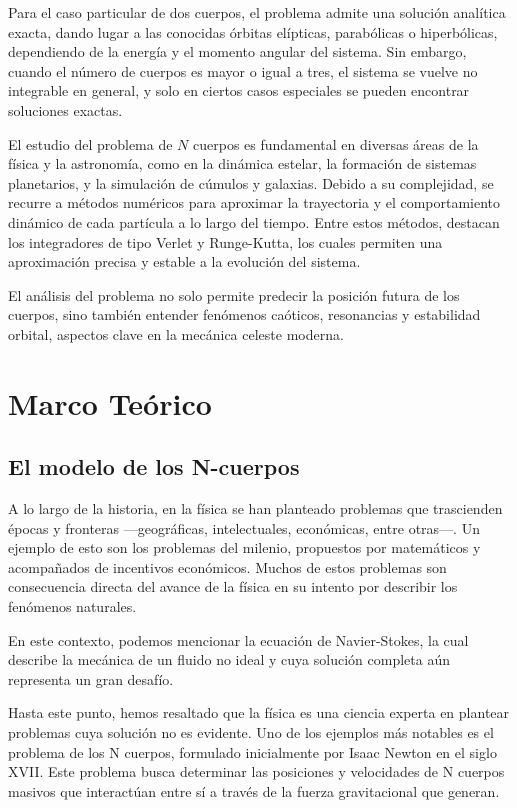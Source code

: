 Para el caso particular de dos cuerpos, el problema admite una solución analítica exacta, dando lugar a las conocidas órbitas elípticas, parabólicas o hiperbólicas, dependiendo de la energía y el momento angular del sistema. Sin embargo, cuando el número de cuerpos es mayor o igual a tres, el sistema se vuelve no integrable en general, y solo en ciertos casos especiales se pueden encontrar soluciones exactas. 

El estudio del problema de \(N\) cuerpos es fundamental en diversas áreas de la física y la astronomía, como en la dinámica estelar, la formación de sistemas planetarios, y la simulación de cúmulos y galaxias. Debido a su complejidad, se recurre a métodos numéricos para aproximar la trayectoria y el comportamiento dinámico de cada partícula a lo largo del tiempo. Entre estos métodos, destacan los integradores de tipo Verlet y Runge-Kutta, los cuales permiten una aproximación precisa y estable a la evolución del sistema. 

El análisis del problema no solo permite predecir la posición futura de los cuerpos, sino también entender fenómenos caóticos, resonancias y estabilidad orbital, aspectos clave en la mecánica celeste moderna.


\section{Marco Teórico }
\subsection{El modelo de los N-cuerpos}

A lo largo de la historia, en la física se han planteado problemas que trascienden épocas y fronteras —geográficas, intelectuales, económicas, entre otras—. Un ejemplo de esto son los problemas del milenio, propuestos por matemáticos y acompañados de incentivos económicos. Muchos de estos problemas son consecuencia directa del avance de la física en su intento por describir los fenómenos naturales.

En este contexto, podemos mencionar la ecuación de Navier-Stokes, la cual describe la mecánica de un fluido no ideal y cuya solución completa aún representa un gran desafío.


Hasta este punto, hemos resaltado que la física es una ciencia experta en plantear problemas cuya solución no es evidente. Uno de los ejemplos más notables es el problema de los N cuerpos, formulado inicialmente por Isaac Newton en el siglo XVII. Este problema busca determinar las posiciones y velocidades de N cuerpos masivos que interactúan entre sí a través de la fuerza gravitacional que generan.

